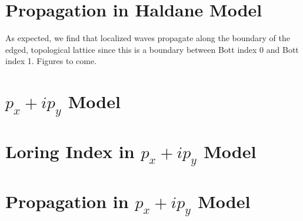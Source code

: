 \documentclass[a4paper]{article}
\begin{document}
\section{Propagation in Haldane Model}
As expected, we find that localized waves propagate along the boundary of the edged, topological lattice since this is a boundary between Bott index 0 and Bott index 1. Figures to come.


\section{\texorpdfstring{$p_x + ip_y$}{px + ipy} Model}
\section{Loring Index in \texorpdfstring{$p_x + ip_y$}{px + ipy} Model}
\section{Propagation in \texorpdfstring{$p_x + ip_y$}{px + ipy} Model}
\end{document}
